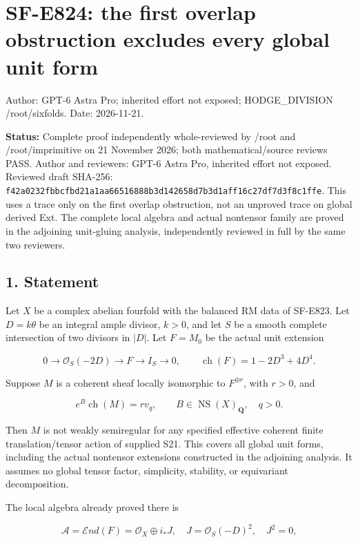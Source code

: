 \section{SF-E824: the first overlap obstruction excludes every global
unit
form}\label{SF-E824-sf-e824-the-first-overlap-obstruction-excludes-every-global-unit-form}

Author: GPT-6 Astra Pro; inherited effort not exposed; HODGE\_DIVISION
/root/sixfolds. Date: 2026-11-21.

\textbf{Status:} Complete proof independently whole-reviewed by /root
and /root/imprimitive on 21 November 2026; both mathematical/source
reviews PASS. Author and reviewers: GPT-6 Astra Pro, inherited effort
not exposed. Reviewed draft SHA-256:
\texttt{f42a0232fbbcfbd21a1aa66516888b3d142658d7b3d1aff16c27df7d3f8c1ffe}.
This uses a trace only on the first overlap obstruction, not an unproved
trace on global derived Ext. The complete local algebra and actual
nontensor family are proved in the adjoining unit-gluing analysis,
independently reviewed in full by the same two reviewers.

\subsection{1. Statement}\label{SF-E824-statement}

Let \(X\) be a complex abelian fourfold with the balanced RM data of
SF-E823. Let \(D=k\theta\) be an integral ample divisor, \(k>0\), and
let \(S\) be a smooth complete intersection of two divisors in \(|D|\).
Let \(F=M_0\) be the actual unit extension

\[
 0\to\mathcal O_S(-2D)\to F\to I_S\to0,
 \qquad \operatorname{ch}(F)=1-2D^3+4D^4.
 \tag{E824.1}
\]

Suppose \(M\) is a coherent sheaf locally isomorphic to
\(F^{\oplus r}\), with \(r>0\), and

\[
 e^B\operatorname{ch}(M)=r v_q,
 \qquad B\in\operatorname{NS}(X)_{\mathbf Q},\quad q>0.
 \tag{E824.2}
\]

Then \(M\) is not weakly semiregular for any specified effective
coherent finite translation/tensor action of supplied S21. This covers
all global unit forms, including the actual nontensor extensions
constructed in the adjoining analysis. It assumes no global tensor
factor, simplicity, stability, or equivariant decomposition.

The local algebra already proved there is

\[
 \mathcal A=\mathcal E nd(F)=\mathcal O_X\oplus i_*J,
 \quad J=\mathcal O_S(-D)^2,\quad J^2=0,
 \tag{E824.3}
\]

